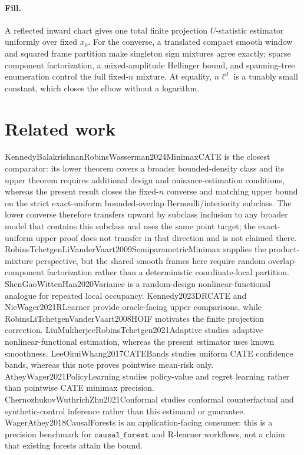 \documentclass{article}
\begin{document}
\paragraph{Fill.} A reflected inward chart gives one total finite projection \(U\)-statistic estimator uniformly over fixed \(x_0\). For the converse, a translated compact smooth window and squared frame partition make singleton sign mixtures agree exactly; sparse component factorization, a mixed-amplitude Hellinger bound, and spanning-tree enumeration control the full fixed-\(n\) mixture. At equality, \(n\ell^d\) is a tunably small constant, which closes the elbow without a logarithm.

\section{Related work}

KennedyBalakrishnanRobinsWasserman2024MinimaxCATE is the closest comparator: its lower theorem covers a broader bounded-density class and its upper theorem requires additional design and nuisance-estimation conditions, whereas the present result closes the fixed-\(n\) converse and matching upper bound on the strict exact-uniform bounded-overlap Bernoulli/interiority subclass. The lower converse therefore transfers upward by subclass inclusion to any broader model that contains this subclass and uses the same point target; the exact-uniform upper proof does not transfer in that direction and is not claimed there. RobinsTchetgenLiVanderVaart2009SemiparametricMinimax supplies the product-mixture perspective, but the shared smooth frames here require random overlap-component factorization rather than a deterministic coordinate-local partition. ShenGaoWittenHan2020Variance is a random-design nonlinear-functional analogue for repeated local occupancy. Kennedy2023DRCATE and NieWager2021RLearner provide oracle-facing upper comparisons, while RobinsLiTchetgenVanderVaart2008HOIF motivates the finite projection correction. LiuMukherjeeRobinsTchetgen2021Adaptive studies adaptive nonlinear-functional estimation, whereas the present estimator uses known smoothness. LeeOkuiWhang2017CATEBands studies uniform CATE confidence bands, whereas this note proves pointwise mean-risk only. AtheyWager2021PolicyLearning studies policy-value and regret learning rather than pointwise CATE minimax precision. ChernozhukovWuthrichZhu2021Conformal studies conformal counterfactual and synthetic-control inference rather than this estimand or guarantee. WagerAthey2018CausalForests is an application-facing consumer: this is a precision benchmark for \(\texttt{causal\_forest}\) and R-learner workflows, not a claim that existing forests attain the bound.
\end{document}
